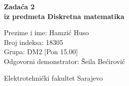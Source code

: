 \documentclass[12pt]{article}
\newcommand{\prezimeIme}{Hamzić Huso}
\newcommand{\brIndexa}{18305}
\newcommand{\brZadace}{2}
\newcommand{\grupa}{DM2 [Pon 15.00]}
\newcommand{\demos}{Šeila Bećirović}
\begin{document}
    
    \thispagestyle{empty}
    \begin{center}
      \vspace*{1cm}

      \vspace*{2cm}
      {\huge \bf Zadaća \brZadace } \\
      \vspace*{1cm}
      {\Large \bf iz predmeta Diskretna matematika}

      \vspace*{2cm}

      {\Large Prezime i ime: \prezimeIme} \\
      \vspace*{0.75cm}
      {\Large Broj indeksa: \brIndexa} \\
      \vspace*{0.75cm}
      {\Large Grupa: \grupa} \\
      \vspace*{0.75cm}
      {\Large Odgovorni demonstrator: \demos} \\
      \vspace*{2cm}
      \renewcommand{\arraystretch}{1.75}
      \vfill


      {\large Elektrotehnički fakultet Sarajevo}

    \end{center}
    \newpage
    \thispagestyle{empty}
    
\end{document}
